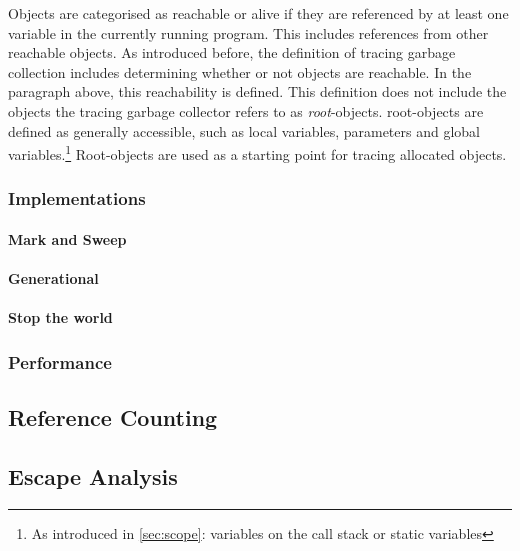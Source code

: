 Objects are categorised as reachable or alive if they are referenced by at
least one variable in the currently running program. This includes references
from other reachable objects. As introduced before, the definition of tracing
garbage collection includes determining whether or not objects are reachable.
In the paragraph above, this reachability is defined. This definition does not
include the objects the tracing garbage collector refers to as
\textit{root}-objects. root-objects are defined as generally accessible, such
as local variables, parameters and global variables.\footnote{As introduced in
\autoref{sec:scope}: variables on the call stack or static variables}
Root-objects are used as a starting point for tracing allocated objects.


\subsubsection{Implementations}
\paragraph{Mark and Sweep}
\paragraph{Generational}
\paragraph{Stop the world}
\subsubsection{Performance}

\subsection{Reference Counting}
\subsection{Escape Analysis}
